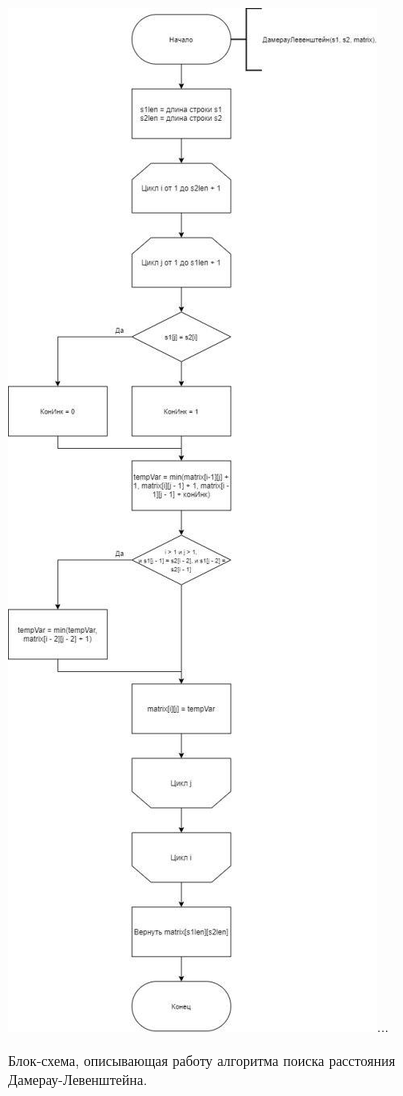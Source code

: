 \documentclass[12pt]{report}
\begin{document}
\begin{figure}
\begin{center}
\includegraphics[scale=0.54]{inc/img/DamLev.jpg}{...}
\captionsetup{justification=centering}
	\caption{Блок-схема, описывающая работу алгоритма поиска расстояния Дамерау-Левенштейна.}
	\label{KC:4}

\end{center}
\end{figure}
\end{document}
